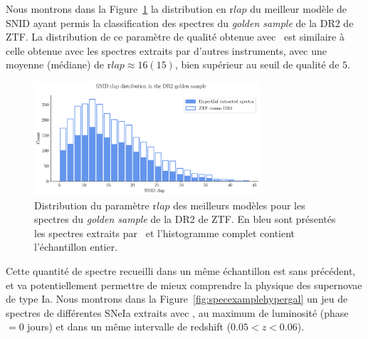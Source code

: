 \documentclass[../main/main.tex]{subfiles}
\begin{document}
Nous montrons dans la Figure~\ref{fig:rlapdistribution} la distribution
en r$lap$ du meilleur modèle de SNID ayant permis la classification des
spectres du \textit{golden sample} de la DR2 de ZTF. La distribution de ce paramètre de qualité obtenue avec
\hypergal\ est similaire à celle obtenue avec les spectres extraits par d'autres
instruments, avec une moyenne (médiane) de r$lap\approx16(15)$, bien
supérieur au seuil de qualité de $5$.

\begin{figure}[ht]
  \centering
  \includegraphics[width=0.75\textwidth]{../figures/09_dr2/rlapdistribution_dr2.pdf}
  \caption[Distribution du paramètre r$lap$ des meilleurs modèles
   pour les spectres du \textit{golden sample} de la DR2 de ZTF.]{Distribution du paramètre r$lap$ des meilleurs modèles
   pour les spectres du \textit{golden sample} de la DR2 de
  ZTF. En bleu sont présentés les spectres extraits par \hypergal\ et
  l'histogramme complet contient l'échantillon entier. }
  \label{fig:rlapdistribution}
\end{figure}


Cette quantité de spectre recueilli dans un même échantillon est sans
précédent, et va potentiellement permettre de mieux comprendre la
physique des supernovae de type Ia. Nous montrons dans la
Figure~\ref{fig:specexamplehypergal} un jeu de spectres de
différentes SNeIa extraits avec \hypergal, au maximum de luminosité (phase $=0$ jours) et
dans un même intervalle de redshift ($0.05<z<0.06$). 
\end{document}
